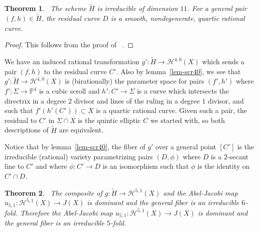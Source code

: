 \documentclass[amssymb,twoside,12 pt,amscd,reqno]{amsart}
\theoremstyle{plain}
\newtheorem{thm}{Theorem}[section]
\theoremstyle{definition}
\newcommand{\Hdg}[2]{\mathcal{H}^{#1,#2}}
\newcommand{\PP}{\mathbb{P}}
\def\ps{\vspace{4pt}}
\begin{document}
\begin{thm}~\label{thm-irr51}  
The scheme $\widetilde{H}$ is irreducible of dimension
$11$.  For a general pair $(f,h)\in \widetilde{H}$, the residual curve
$D$ is a smooth, nondegenerate, quartic rational curve.  
\end{thm}

\begin{proof}
This follows from the proof of ~\cite[theorem 8.1]{HRS1}.
\end{proof}

We have an induced rational transformation $g':\widetilde{H}\rightarrow
\Hdg{4}{0}(X)$ which sends a pair $(f,h)$ to the residual curve $C'$.
Also by lemma~\ref{lem-scr40}, we see that $g':\widetilde{H}\rightarrow
\Hdg{4}{0}(X)$ is (birationally) the parameter space for pairs
$(f',h')$ where $f':\Sigma\rightarrow \PP^4$ is a cubic scroll and
$h':C'\rightarrow \Sigma$ is a curve which intersects the directrix in
a degree $2$ divisor and lines of the ruling in a degree $1$ divisor,
and such that $f'(h'(C'))\subset X$ is a quartic rational curve.  Given
such a pair, the residual to $C'$ in $\Sigma\cap X$ is the quintic
elliptic $C$ we started with, so both descriptions of $\widetilde{H}$
are equivalent.

\ps

Notice that by lemma~\ref{lem-scr40}, the fiber of $g'$ over a general
point $[C']$ is the irreducible (rational) variety parametrizing pairs
$(D,\phi)$ 
where $D$ is a $2$-secant line to $C'$ and where $\phi:C'\rightarrow
D$ is an isomorphism such that $\phi$ is the identity on $C'\cap D$.  

\begin{thm}~\label{thm-irrfib2} The composite of
$g:\widetilde{H}\rightarrow \Hdg{5}{1}(X)$ and the 
Abel-Jacobi map
$u_{5,1}:\Hdg{5}{1}(X)\rightarrow J(X)$ is dominant and the general
fiber is an irreducible $6$-fold.  Therefore the Abel-Jacobi map
$u_{5,1}:\Hdg{5}{1}(X)\rightarrow J(X)$ is dominant and the general
fiber is an irreducible $5$-fold.
\end{thm}
\end{document}
